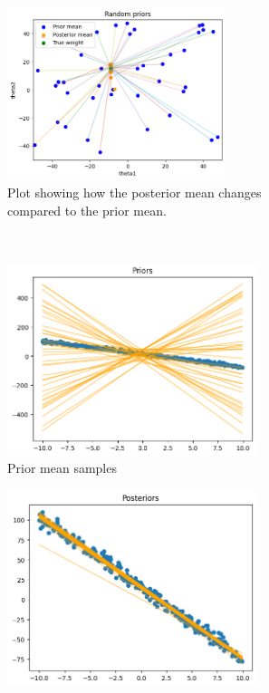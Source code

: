 \begin{figure}[H]
\begin{subfigure}{1\textwidth}
  \centering
  \includegraphics[width=0.7\textwidth]{assets/week1/random-priors.png}
  \caption{Plot showing how the posterior mean changes compared to the prior mean.}
\end{subfigure}\\
\begin{subfigure}{.5\textwidth}
  \centering
  \includegraphics[width=0.8\textwidth]{assets/week1/random-priors-plot.png}
  \caption{Prior mean samples}
\end{subfigure}%
\begin{subfigure}{.5\textwidth}
  \centering
  \includegraphics[width=0.8\textwidth]{assets/week1/random-priors-posteriors.png}

\end{subfigure}
\end{figure}
